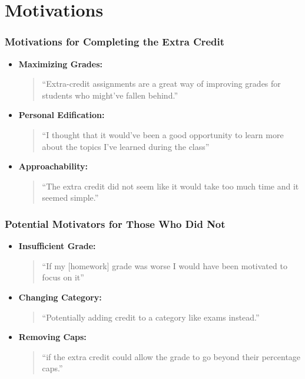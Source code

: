 \documentclass{beamer}
\begin{document}
\section{Motivations}


\begin{frame}[fragile]
    \frametitle{Motivations for Completing the Extra Credit}

    \begin{itemize}
      \item \textbf{Maximizing Grades:}\\
        \begin{quote}
          ``Extra-credit assignments are a great way of improving grades for
          students who might've fallen behind.''
        \end{quote}
      \item \textbf{Personal Edification:}\\
        \begin{quote}
          ``I thought that it would've been a good opportunity to learn more about
          the topics I've learned during the class''
        \end{quote}
      \item \textbf{Approachability:}\\
        \begin{quote}
          ``The extra credit did not seem like it would take too much time and it seemed simple.''
        \end{quote}
    \end{itemize}

\end{frame}

\begin{frame}
    \frametitle{Potential Motivators for Those Who Did Not}

    \begin{itemize}
      \item \textbf{Insufficient Grade:}\\
        \begin{quote}
          ``If my [homework] grade was worse I would have been motivated to focus on it''
        \end{quote}
      \item \textbf{Changing Category:}\\
        \begin{quote}
          ``Potentially adding credit to a category like exams instead.''
        \end{quote}
      \item \textbf{Removing Caps:}\\
        \begin{quote}
          ``if the extra credit could allow the grade to go beyond their percentage caps.''
        \end{quote}
    \end{itemize}


\end{frame}
\end{document}
